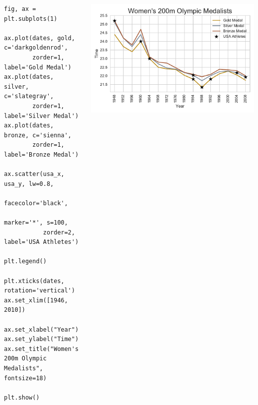 \documentclass{beamer}
\begin{document}
\begin{frame}[fragile]
\tiny{
\begin{columns}
\begin{column}{0.45\textwidth}
\begin{verbatim}
fig, ax = plt.subplots(1)

ax.plot(dates, gold, c='darkgoldenrod',
        zorder=1, label='Gold Medal')
ax.plot(dates, silver, c='slategray',
        zorder=1, label='Silver Medal')
ax.plot(dates, bronze, c='sienna',
        zorder=1, label='Bronze Medal')

ax.scatter(usa_x, usa_y, lw=0.8,
           facecolor='black',
           marker='*', s=100,
           zorder=2, label='USA Athletes')

plt.legend()

plt.xticks(dates, rotation='vertical')
ax.set_xlim([1946, 2010])

ax.set_xlabel("Year")
ax.set_ylabel("Time")
ax.set_title("Women's 200m Olympic Medalists", fontsize=18)

plt.show()
\end{verbatim}
\end{column}
\begin{column}{0.55\textwidth}
\includegraphics[width=\textwidth]{../olympics_8.pdf}
\end{column}
\end{columns}
}
\end{frame}
\end{document}
